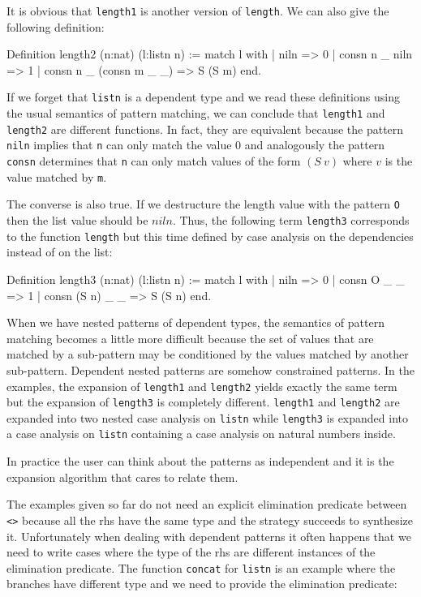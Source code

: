 It is obvious that \texttt{length1} is  another version of
\texttt{length}. We can also give the following definition:
\begin{coq_example}
Definition length2 (n:nat) (l:listn n) :=
  match l with
  | niln => 0
  | consn n _ niln => 1
  | consn n _ (consn m _ _) => S (S m)
  end.
\end{coq_example}

If we forget that \texttt{listn} is a dependent type and we read these
definitions using the usual semantics of pattern matching,  we can conclude
that \texttt{length1}
and \texttt{length2} are different functions.
In fact, they are equivalent
because the pattern \texttt{niln} implies that \texttt{n} can only match
the value $0$ and analogously the pattern \texttt{consn} determines that \texttt{n} can
only match  values of the form  $(S~v)$ where $v$ is the value matched by
\texttt{m}. 

The converse is also true. If
we destructure the  length  value with the pattern \texttt{O} then the list
value should be $niln$. 
Thus, the following term \texttt{length3} corresponds to the function
\texttt{length} but this time defined by case analysis on the dependencies instead of on the list:

\begin{coq_example}
Definition length3 (n:nat) (l:listn n) :=
  match l with
  | niln => 0
  | consn O _ _ => 1
  | consn (S n) _ _ => S (S n)
  end.
\end{coq_example}

When we have nested patterns of dependent types, the semantics of
pattern matching becomes a little more difficult because
the set of values that are matched by a sub-pattern may be conditioned by the
values matched by another sub-pattern. Dependent nested patterns are
somehow constrained patterns. 
In the examples, the expansion of
\texttt{length1} and \texttt{length2} yields exactly the same term
 but the
expansion of \texttt{length3} is completely different. \texttt{length1} and
\texttt{length2} are expanded into two nested case analysis on
\texttt{listn} while \texttt{length3} is expanded into a case analysis on
\texttt{listn} containing a case analysis on natural numbers inside.


In practice the user can think about the patterns as independent and
it is the expansion algorithm that cares to relate them. \\
\fi
%
%
%

The examples  given so far do not need an explicit elimination predicate
between \texttt{<>} because all the rhs have the same type and the
strategy succeeds to synthesize it.
Unfortunately when dealing with dependent patterns it often happens
that we need to write cases where the type of the rhs are 
different  instances of the elimination  predicate.
The function  \texttt{concat} for \texttt{listn}
is an example where the branches have different type
and we need to provide the elimination predicate:

